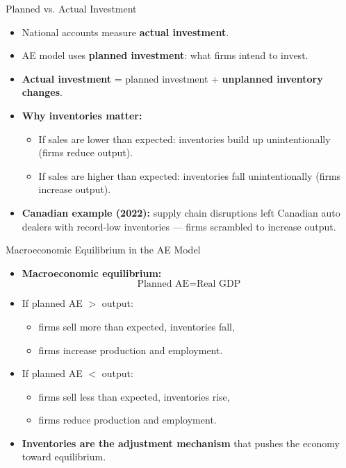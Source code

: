 \documentclass[aspectratio=169]{beamer}
\begin{document}
\begin{frame}{Planned vs. Actual Investment}
\transfade
\begin{itemize}[<+->]
  \item National accounts measure \textbf{actual investment}.
  \item AE model uses \textbf{planned investment}: what firms intend to invest.
  \item \textbf{Actual investment} = planned investment + \textbf{unplanned inventory changes}.
  \item \textbf{Why inventories matter:}
  \begin{itemize}[<+->]
    \item If sales are \alert{lower than expected}: inventories build up unintentionally (firms reduce output).
    \item If sales are \alert{higher than expected}: inventories fall unintentionally (firms increase output).
  \end{itemize}
  \item \textbf{Canadian example (2022):} supply chain disruptions left Canadian auto dealers with record-low inventories --- firms scrambled to increase output.
\end{itemize}
\end{frame}

\begin{frame}{Macroeconomic Equilibrium in the AE Model}
\transfade
\begin{itemize}[<+->]
  \item \textbf{Macroeconomic equilibrium:}
  \[
    \text{Planned AE} = \text{Real GDP}
  \]
  \item If planned AE $>$ output:
  \begin{itemize}[<+->]
    \item firms sell more than expected, inventories fall,
    \item firms \alert{increase} production and employment.
  \end{itemize}
  \item If planned AE $<$ output:
  \begin{itemize}[<+->]
    \item firms sell less than expected, inventories rise,
    \item firms \alert{reduce} production and employment.
  \end{itemize}
  \item \textbf{Inventories are the adjustment mechanism} that pushes the economy toward equilibrium.
\end{itemize}
\end{frame}
\end{document}
